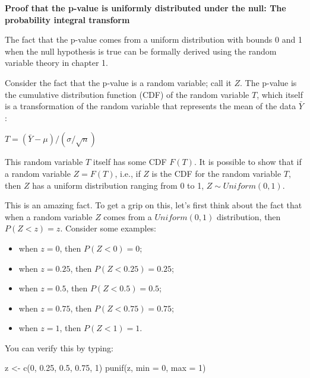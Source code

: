 \documentclass[
  12pt,
]{krantz}
\newenvironment{Shaded}{\begin{snugshade}}{\end{snugshade}}
\newcommand{\AttributeTok}[1]{\textcolor[rgb]{0.77,0.63,0.00}{#1}}
\newcommand{\DecValTok}[1]{\textcolor[rgb]{0.00,0.00,0.81}{#1}}
\newcommand{\FloatTok}[1]{\textcolor[rgb]{0.00,0.00,0.81}{#1}}
\newcommand{\FunctionTok}[1]{\textcolor[rgb]{0.00,0.00,0.00}{#1}}
\newcommand{\NormalTok}[1]{#1}
\newcommand{\OtherTok}[1]{\textcolor[rgb]{0.56,0.35,0.01}{#1}}
\providecommand{\tightlist}{%
  \setlength{\itemsep}{0pt}\setlength{\parskip}{0pt}}
\theoremstyle{definition}
\theoremstyle{definition}
\theoremstyle{definition}
\theoremstyle{definition}
\theoremstyle{remark}
\begin{document}
\begin{blackbox}

\textbf{Proof that the p-value is uniformly distributed under the null: The probability integral transform}

The fact that the p-value comes from a uniform distribution with bounds 0 and 1 when the null hypothesis is true can be formally derived using the random variable theory in chapter 1.

Consider the fact that the p-value is a random variable; call it \(Z\). The p-value is the cumulative distribution function (CDF) of the random variable \(T\), which itself is a transformation of the random variable that represents the mean of the data \(\bar{Y}\):

\(T=(\bar{Y}-\mu)/(\sigma/\sqrt{n})\)

This random variable \(T\) itself has some CDF \(F(T)\). It is possible to show that if a random variable \(Z=F(T)\), i.e., if \(Z\) is the CDF for the random variable \(T\), then \(Z\) has a uniform distribution ranging from 0 to 1, \(Z \sim Uniform(0,1)\).

This is an amazing fact. To get a grip on this, let's first think about the fact that when a random variable \(Z\) comes from a \(Uniform(0,1)\) distribution, then \(P(Z<z)=z\). Consider some examples:

\begin{itemize}
\tightlist
\item
  when \(z=0\), then \(P(Z<0)=0\);
\item
  when \(z=0.25\), then \(P(Z<0.25)=0.25\);
\item
  when \(z=0.5\), then \(P(Z<0.5)=0.5\);
\item
  when \(z=0.75\), then \(P(Z<0.75)=0.75\);
\item
  when \(z=1\), then \(P(Z<1)=1\).
\end{itemize}

You can verify this by typing:

\begin{Shaded}
\begin{Highlighting}[]
\NormalTok{z }\OtherTok{\textless{}{-}} \FunctionTok{c}\NormalTok{(}\DecValTok{0}\NormalTok{, }\FloatTok{0.25}\NormalTok{, }\FloatTok{0.5}\NormalTok{, }\FloatTok{0.75}\NormalTok{, }\DecValTok{1}\NormalTok{)}
\FunctionTok{punif}\NormalTok{(z, }\AttributeTok{min =} \DecValTok{0}\NormalTok{, }\AttributeTok{max =} \DecValTok{1}\NormalTok{)}
\end{Highlighting}
\end{Shaded}


\end{blackbox}
\end{document}
